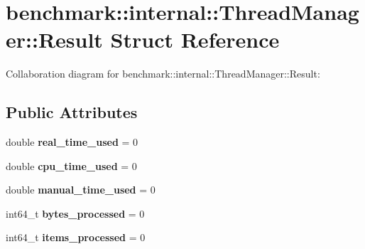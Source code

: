 \hypertarget{structbenchmark_1_1internal_1_1_thread_manager_1_1_result}{}\section{benchmark\+:\+:internal\+:\+:Thread\+Manager\+:\+:Result Struct Reference}
\label{structbenchmark_1_1internal_1_1_thread_manager_1_1_result}


Collaboration diagram for benchmark\+:\+:internal\+:\+:Thread\+Manager\+:\+:Result\+:
\subsection*{Public Attributes}
\begin{DoxyCompactItemize}
\item 
\mbox{\label{structbenchmark_1_1internal_1_1_thread_manager_1_1_result_ae99c38a5537d390f8e1457eb577f6e42}} 
double {\bfseries real\+\_\+time\+\_\+used} = 0
\item 
\mbox{\label{structbenchmark_1_1internal_1_1_thread_manager_1_1_result_ac390b2472bc9c6fe5befc9dd2eb7e1a5}} 
double {\bfseries cpu\+\_\+time\+\_\+used} = 0
\item 
\mbox{\label{structbenchmark_1_1internal_1_1_thread_manager_1_1_result_a2136846b7b95464ceb42fbeeaa99faca}} 
double {\bfseries manual\+\_\+time\+\_\+used} = 0
\item 
\mbox{\label{structbenchmark_1_1internal_1_1_thread_manager_1_1_result_a2c7e552b4586c27e04e9feb6f8f4dcb2}} 
int64\+\_\+t {\bfseries bytes\+\_\+processed} = 0
\item 
\mbox{\label{structbenchmark_1_1internal_1_1_thread_manager_1_1_result_a33f02b157d4b780c7d137cc0ec7e69bc}} 
int64\+\_\+t {\bfseries items\+\_\+processed} = 0
\item 
\mbox{\label{structbenchmark_1_1internal_1_1_thread_manager_1_1_result_aa4fea1ad400f871958cb546c545efd10}} 

\end{DoxyCompactItemize}
